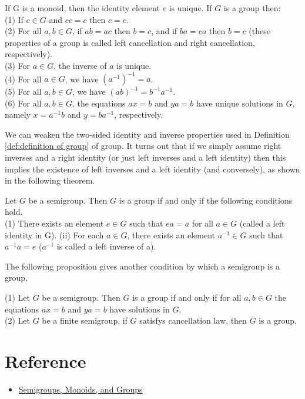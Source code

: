 \begin{proposition}{}{}
    If G is a monoid, then the identity element $e$ is unique. If $G$ is a group then:\\
    (1) If $c \in G$ and $cc = c$ then $c = e$.\\
    (2) For all $a,b\in G$, if $ab=ac$ then $b=c$, 
    and if $ba=ca$ then $b=c$ (these properties
    of a group is called left cancellation and right cancellation, respectively).\\
    (3) For $a\in G$, the inverse of $a$ is unique.\\
    (4) For all $a\in G$, we have $(a^{-1})^{-1}=a$.\\
    (5) For all $a,b\in G$, we have $(ab)^{-1}=b^{-1}a^{-1}$.\\
    (6) For all $a,b\in G$, the equations $ax=b$ and $ya=b$ have unique solutions in $G$,
    namely $x=a^{-1}b$ and $y=ba^{-1}$, respectively.
\end{proposition}

\begin{remark}
    We can weaken the two-sided identity and inverse properties used in Definition \ref{def:definition of group} 
    of group. It turns out that if we simply assume right inverses and a right
    identity (or just left inverses and a left identity) then this implies the existence of
    left inverses and a left identity (and conversely), as shown in the following theorem.
\end{remark}

\begin{proposition}{}{}
    Let $G$ be a semigroup. 
    Then $G$ is a group if and only if the
    following conditions hold.\\
    (1) There exists an element $e \in G$ such that $ea = a$ for all $a \in G$ (called a left
    identity in G).
    (ii) For each $a \in G$, there exists an element $a^{-1}\in G$ such that $a^{-1}a=e$
    ($a^{-1}$ is called a left inverse of a).
\end{proposition}

The following proposition gives another condition by which a semigroup is
a group.

\begin{proposition}{}{}
    (1) Let $G$ be a semigroup. Then $G$ is a group if and only if for
    all $a, b \in G$ the equations $ax = b$ and $ya = b$ have solutions in $G$.\\
    (2) Let $G$ be a finite semigroup, if $G$ satisfys cancellation law, then $G$ is a group.
\end{proposition}

\section{Reference}

\begin{itemize}
    \item \href{https://faculty.etsu.edu/gardnerr/5410/notes/I-1.pdf}{Semigroups, Monoids, and Groups}
\end{itemize}